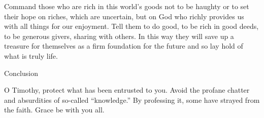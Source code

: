 {\par }{\PP {}Command
those who are rich
in
this world’s goods
not
to be haughty
or
to set
their hope
on
riches,
which are uncertain,
but
on
God
who richly
provides
us
with all things
for
our enjoyment.
Tell them to do good,
to be rich
in
good
deeds,
to be
generous givers,
sharing with others.
In this way they will save up a treasure
for themselves
as a firm
foundation
for
the future
and so
lay hold
of what is truly
life.
\par }{\SH Conclusion
\par }{\PP {}O
Timothy,
protect
what has been entrusted
to you. Avoid
the profane
chatter
and
absurdities
of so-called
“knowledge.”
By professing
it, some
have strayed
from
the faith.
Grace
be with
you all.
\par }